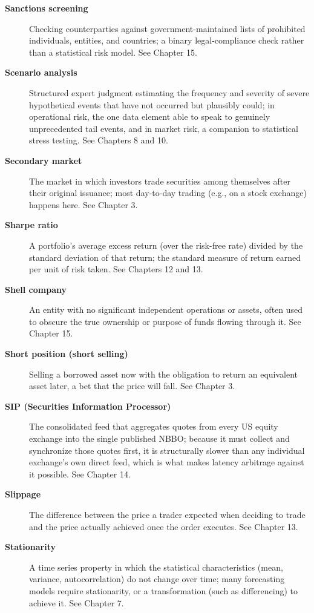 \documentclass[../ai_in_finance]{subfiles}
\begin{document}
\begin{description}
\item[\textbf{Sanctions screening}] Checking counterparties against government-maintained lists of prohibited individuals, entities, and countries; a binary legal-compliance check rather than a statistical risk model. See Chapter 15.

\item[\textbf{Scenario analysis}] Structured expert judgment estimating the frequency and severity of severe hypothetical events that have not occurred but plausibly could; in operational risk, the one data element able to speak to genuinely unprecedented tail events, and in market risk, a companion to statistical stress testing. See Chapters 8 and 10.

\item[\textbf{Secondary market}] The market in which investors trade securities among themselves after their original issuance; most day-to-day trading (e.g., on a stock exchange) happens here. See Chapter 3.

\item[\textbf{Sharpe ratio}] A portfolio's average excess return (over the risk-free rate) divided by the standard deviation of that return; the standard measure of return earned per unit of risk taken. See Chapters 12 and 13.

\item[\textbf{Shell company}] An entity with no significant independent operations or assets, often used to obscure the true ownership or purpose of funds flowing through it. See Chapter 15.

\item[\textbf{Short position (short selling)}] Selling a borrowed asset now with the obligation to return an equivalent asset later, a bet that the price will fall. See Chapter 3.

\item[\textbf{SIP (Securities Information Processor)}] The consolidated feed that aggregates quotes from every US equity exchange into the single published NBBO; because it must collect and synchronize those quotes first, it is structurally slower than any individual exchange's own direct feed, which is what makes latency arbitrage against it possible. See Chapter 14.

\item[\textbf{Slippage}] The difference between the price a trader expected when deciding to trade and the price actually achieved once the order executes. See Chapter 13.

\item[\textbf{Stationarity}] A time series property in which the statistical characteristics (mean, variance, autocorrelation) do not change over time; many forecasting models require stationarity, or a transformation (such as differencing) to achieve it. See Chapter 7.


\end{description}
\end{document}
